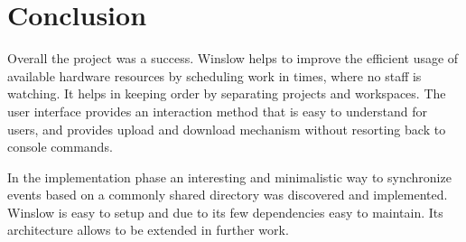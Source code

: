 \chapter{Conclusion}

Overall the project was a success.
Winslow helps to improve the efficient usage of available hardware resources by scheduling work in times, where no staff is watching.
It helps in keeping order by separating projects and workspaces.
The user interface provides an interaction method that is easy to understand for users, and provides upload and download mechanism without resorting back to console commands.

In the implementation phase an interesting and minimalistic way to synchronize events based on a commonly shared directory was discovered and implemented.
Winslow is easy to setup and due to its few dependencies  easy to maintain.
Its architecture allows to be extended in further work.
